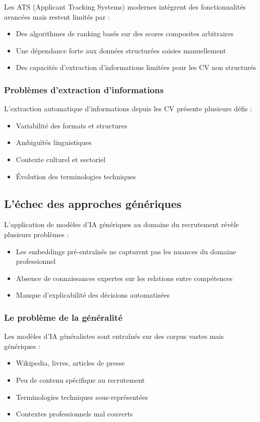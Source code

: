 \documentclass[12pt,a4paper]{report}
\begin{document}
Les ATS (Applicant Tracking Systems) modernes intègrent des fonctionnalités avancées mais restent limités par :
\begin{itemize}
\item Des algorithmes de ranking basés sur des scores composites arbitraires
\item Une dépendance forte aux données structurées saisies manuellement
\item Des capacités d'extraction d'informations limitées pour les CV non structurés
\end{itemize}

\subsubsection{Problèmes d'extraction d'informations}

L'extraction automatique d'informations depuis les CV présente plusieurs défis :
\begin{itemize}
\item Variabilité des formats et structures
\item Ambiguïtés linguistiques
\item Contexte culturel et sectoriel
\item Évolution des terminologies techniques
\end{itemize}

\subsection{L'échec des approches génériques}

L'application de modèles d'IA génériques au domaine du recrutement révèle plusieurs problèmes :
\begin{itemize}
\item Les embeddings pré-entraînés ne capturent pas les nuances du domaine professionnel
\item Absence de connaissances expertes sur les relations entre compétences
\item Manque d'explicabilité des décisions automatisées
\end{itemize}

\subsubsection{Le problème de la généralité}

Les modèles d'IA généralistes sont entraînés sur des corpus vastes mais génériques :
\begin{itemize}
\item Wikipedia, livres, articles de presse
\item Peu de contenu spécifique au recrutement
\item Terminologies techniques sous-représentées
\item Contextes professionnels mal couverts
\end{itemize}
\end{document}
